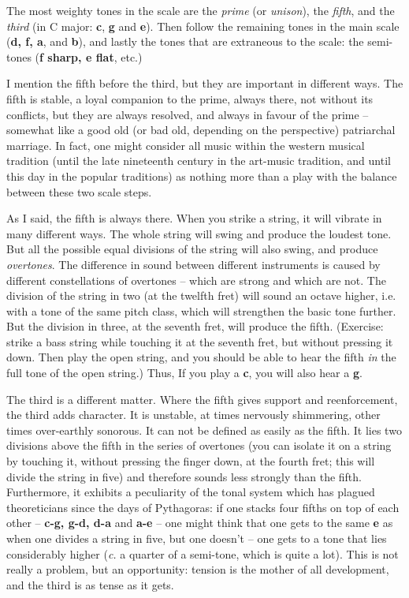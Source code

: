 \begin{articlelayout}
The most weighty tones in the scale are the \emph{prime} (or
\emph{unison}), the \emph{fifth}, and the \emph{third} (in C major:
\textbf{c}, \textbf{g} and \textbf{e}). Then follow the remaining
tones in the main scale (\textbf{d, f, a}, and \textbf{b}), and lastly
the tones that are extraneous to the scale: the semi-tones (\textbf{f
sharp, e flat}, etc.)

I mention the fifth before the third, but they are important in
different ways. The fifth is stable, a loyal companion to the prime,
always there, not without its conflicts, but they are always resolved,
and always in favour of the prime -- somewhat like a good old (or bad
old, depending on the perspective) patriarchal marriage. In fact, one
might consider all music within the western musical tradition (until
the late nineteenth century in the art-music tradition, and until this
day in the popular traditions) as nothing more than a play with the
balance between these two scale steps.

As I said, the fifth is always there. When you strike a string, it
will vibrate in many different ways. The whole string will swing and
produce the loudest tone. But all the possible equal divisions of the
string will also swing, and produce \emph{overtones}. The difference
in sound between different instruments is caused by different
constellations of overtones -- which are strong and which are not. The
division of the string in two (at the twelfth fret) will sound an
octave higher, i.e. with a tone of the same pitch class, which will
strengthen the basic tone further. But the division in three, at the
seventh fret, will produce the fifth. (Exercise: strike a bass string
while touching it at the seventh fret, but without pressing it
down. Then play the open string, and you should be able to hear the
fifth \emph{in} the full tone of the open string.) Thus, If you play a
\textbf{c}, you will also hear a \textbf{g}.

The third is a different matter. Where the fifth gives support and
reenforcement, the third adds character. It is unstable, at times
nervously shimmering, other times over-earthly sonorous. It can not be
defined as easily as the fifth. It lies two divisions above the fifth
in the series of overtones (you can isolate it on a string by touching it,
without pressing the finger down, at the fourth fret; this will divide the string
in five) and therefore sounds less strongly than the
fifth. Furthermore, it exhibits a peculiarity of the tonal system
which has plagued theoreticians since the days of Pythagoras: if one
stacks four fifths on top of each other -- \textbf{c-g, g-d, d-a} and
\textbf{a-e} -- one might think that one gets to the same
\textbf{e} as when one divides a string in five, but one doesn't --
one gets to a tone that lies considerably higher (\emph{c.} a quarter
of a semi-tone, which is quite a lot). This is not really a problem,
but an opportunity: tension is the mother of all development, and the
third is as tense as it gets.


\end{articlelayout}
